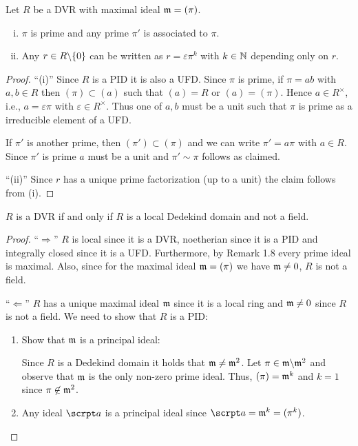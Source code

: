 
\begin{remin}
Let $R$ be a DVR with maximal ideal $\mathfrak{m} = (\pi)$.
\begin{enumerate}[(i)]
	\item $\pi$ is prime and any prime $\pi'$ is associated to $\pi$.
	\item Any $r \in R \backslash \{0\}$ can be written as $r = \varepsilon \pi^k$ with $k \in\mathbb{N}$ depending only on $r$.
\end{enumerate}
\end{remin}

\begin{proof}
\enquote{(i)}
Since $R$ is a PID it is also a UFD. Since $\pi$ is prime, if $\pi = ab$ with $a,b \in R$ then
$(\pi) \subset (a)$ such that $(a) = R$ or $(a) = (\pi)$. Hence $a \in R^\times$, i.e., $a = \varepsilon \pi$ with $\varepsilon \in R^\times$. Thus one of $a, b$ must be a unit such that $\pi$ is prime as a irreducible element of a UFD.

\bigskip If $\pi'$ is another prime, then $(\pi') \subset (\pi)$ and we can write $\pi' = a \pi$ with $a \in R$. Since $\pi'$ is prime $a$ must be a unit and $ \pi' \sim \pi$ follows as claimed.

\bigskip \enquote{(ii)} Since $r$ has a unique prime factorization (up to a unit) the claim follows from (i).
\end{proof}

\begin{Prop}
$R$ is a DVR if and only if $R$ is a local Dedekind domain and not a field.
\end{Prop}

\begin{proof}
\enquote{$\Rightarrow$} $R$ is local since it is a DVR, noetherian since it is a PID and integrally closed since it is a UFD. Furthermore, by Remark 1.8 every prime ideal is maximal. Also, since for the maximal ideal $\mathfrak{m} = (\pi)$ we have $\mathfrak{m} \neq 0$, $R$ is not a field.

\bigskip \enquote{$\Leftarrow$} $R$ has a unique maximal ideal $\mathfrak{m}$ since it is a local ring and $\mathfrak{m} \neq 0$ since $R$ is not a field. We need to show that $R$ is a PID:
\begin{enumerate}[(1)]
	\item Show that $\mathfrak{m}$ is a principal ideal:
	
			Since $R$ is a Dedekind domain it holds that $\mathfrak{m} \neq \mathfrak{m}^2$. Let $\pi \in \mathfrak{m} \backslash \mathfrak{m}^2$ and observe that $\mathfrak{m}$ is the only non-zero prime ideal.
			Thus, $(\pi) = \mathfrak{m}^k$ and $k=1$ since $\pi \not \in \mathfrak{m}^2$.
	\item Any ideal $\a$ is a principal ideal since $\a = \m^k = (\pi^k)$.
\end{enumerate}
\end{proof}


